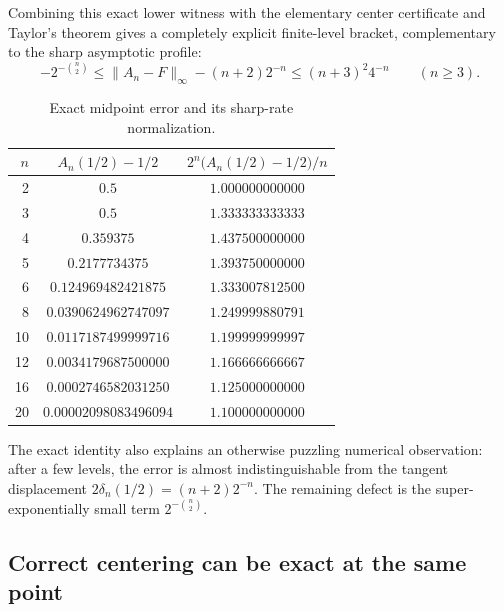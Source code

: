 \documentclass[11pt,oneside]{article}
\theoremstyle{definition}
\theoremstyle{remark}
\begin{document}
Combining this exact lower witness with the elementary center certificate and Taylor's
theorem gives a completely explicit finite-level bracket, complementary to the sharp
asymptotic profile:
\begin{equation}
 -2^{-\binom n2}
 \le \|A_n-F\|_\infty-(n+2)2^{-n}
 \le (n+3)^2 4^{-n}\qquad(n\ge3).
 \label{tmrates:eq:uniform-finite-bracket}
\end{equation}

\begin{table}[htbp]
\centering
\caption{Exact midpoint error and its sharp-rate normalization.}
\label{tmrates:tab:midpoint}
\begin{tabular}{@{}rcc@{}}
\toprule
$n$ & $A_n(1/2)-1/2$ & $2^n\bigl(A_n(1/2)-1/2\bigr)/n$\\
\midrule
2  & $0.5$                 & $1.000000000000$\\
3  & $0.5$                 & $1.333333333333$\\
4  & $0.359375$            & $1.437500000000$\\
5  & $0.2177734375$        & $1.393750000000$\\
6  & $0.124969482421875$   & $1.333007812500$\\
8  & $0.0390624962747097$  & $1.249999880791$\\
10 & $0.0117187499999716$  & $1.199999999997$\\
12 & $0.0034179687500000$  & $1.166666666667$\\
16 & $0.0002746582031250$  & $1.125000000000$\\
20 & $0.00002098083496094$ & $1.100000000000$\\
\bottomrule
\end{tabular}
\end{table}

The exact identity also explains an otherwise puzzling numerical observation: after a few
levels, the error is almost indistinguishable from the tangent displacement
$2\delta_n(1/2)=(n+2)2^{-n}$.  The remaining defect is the super-exponentially small term
$2^{-\binom n2}$.

\subsection{Correct centering can be exact at the same point}
\end{document}
